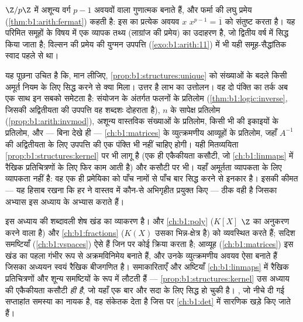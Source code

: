 \begin{remark}[फर्मा, संरचनात्मक रूप में]
 $\Z/p\Z$ में अशून्य वर्ग $p - 1$ अवयवों वाला गुणात्मक  बनाते
हैं, और फर्मा की लघु प्रमेय (\cref{thm:b1:arith:fermat}) कहती है: इस  का
प्रत्येक अवयव $x$ $x^{p-1} = \overline 1$ को संतुष्ट करता है। यह परिमित
समूहों के विषय में एक व्यापक तथ्य (लाग्रांज की प्रमेय) का उदाहरण है, जो
द्वितीय वर्ष में सिद्ध किया जाता है; विल्सन की प्रमेय की युग्मन उपपत्ति
(\cref{exo:b1:arith:11}) में भी यही समूह-सैद्धांतिक स्वाद पहले से था।
\end{remark}

\begin{remark}[मध्यांतर: अमूर्तता से क्या मिलता है]\label{rem:b1:structures:interlude}
यह पूछना उचित है कि, मान लीजिए, \cref{prop:b1:structures:unique} को संख्याओं
के बदले किसी अमूर्त नियम के लिए सिद्ध करने से क्या मिला। उत्तर है लाभ का
उत्तोलन। वह दो पंक्ति का तर्क अब एक साथ इन सबको समेटता है: संयोजन के अंतर्गत
फलनों के प्रतिलोम (\cref{thm:b1:logic:inverse}, जिसकी अद्वितीयता की उपपत्ति
वह शब्दशः दोहराता है), $n$ के सापेक्ष प्रतिलोम
(\cref{prop:b1:arith:invmod}), अशून्य वास्तविक संख्याओं के प्रतिलोम, किसी भी
 की इकाइयों के प्रतिलोम, और --- बिना देखे ही --- \cref{ch:b1:matrices} के
व्युत्क्रमणीय आव्यूहों के प्रतिलोम, जहाँ $A^{-1}$ की अद्वितीयता के लिए
उपपत्ति की एक पंक्ति भी नहीं चाहिए होगी। यही मितव्ययिता
\cref{prop:b1:structures:kernel} पर भी लागू है (एक ही एकैकीयता कसौटी, जो
\cref{ch:b1:linmaps} में रैखिक प्रतिचित्रणों के लिए फिर काम आती है) और
 कसौटी पर भी। यहाँ अमूर्तता व्यापकता के लिए व्यापकता नहीं है: वह एक ही
प्रमेयिका को पाँच नामों से पाँच बार सिद्ध करने से इनकार है। इसकी कीमत --- यह
हिसाब रखना कि हर  ने वास्तव में कौन-से अभिगृहीत प्रयुक्त किए --- ठीक वही
है जिसका अभ्यास इस अध्याय के अभ्यास कराते हैं।
\end{remark}

\begin{remark}[यह अध्याय कहाँ काम आता है]\label{rem:b1:structures:whereused}
इस अध्याय की शब्दावली शेष खंड का व्याकरण है।  और 
\cref{ch:b1:poly} ($K[X]$ $\Z$ का अनुकरण करने वाला  है) और
\cref{ch:b1:fractions} ($K(X)$ उसका भिन्न-क्षेत्र है) को व्यवस्थित करते हैं;
सदिश समष्टियाँ (\cref{ch:b1:vspaces}) ऐसे  हैं जिन पर कोई 
क्रिया करता है; आव्यूह (\cref{ch:b1:matrices}) इस खंड का पहला गंभीर रूप से
अक्रमविनिमेय  बनाते हैं, और उनके व्युत्क्रमणीय अवयव ऐसा  बनाते हैं
जिसका अध्ययन स्वयं रैखिक बीजगणित है। समाकारिताएँ और अष्टियाँ
\cref{ch:b1:linmaps} में रैखिक प्रतिचित्रणों और शून्य समष्टियों के रूप में
लौटती हैं --- \cref{prop:b1:structures:kernel} उस अध्याय की एकैकीयता कसौटी
\emph{ही है}, जो यहाँ एक बार और सदा के लिए सिद्ध हो चुकी है। , जो
नीचे दी गई सप्ताहांत समस्या का नायक है, वह संकेतक देता है जिस पर
\cref{ch:b1:det} में सारणिक खड़े किए जाते हैं।
\end{remark}

